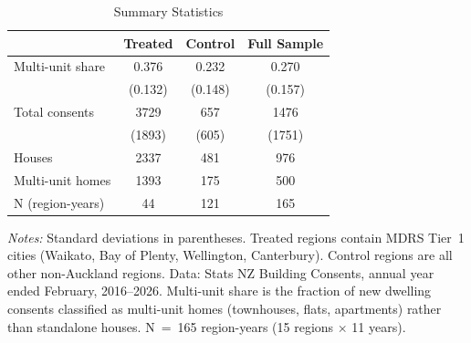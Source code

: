 \begin{table}[H]
\centering
\caption{Summary Statistics}
\label{tab:summary}
\begin{threeparttable}
\begin{tabular}{lccc}
\toprule
 & Treated & Control & Full Sample \\
\midrule
Multi-unit share & 0.376 & 0.232 & 0.270 \\
 & (0.132) & (0.148) & (0.157) \\
Total consents & 3729 & 657 & 1476 \\
 & (1893) & (605) & (1751) \\
Houses & 2337 & 481 & 976 \\
Multi-unit homes & 1393 & 175 & 500 \\
N (region-years) & 44 & 121 & 165 \\
\bottomrule
\end{tabular}
\begin{tablenotes}[flushleft]
\small
\item \textit{Notes:} Standard deviations in parentheses. Treated regions contain MDRS Tier~1 cities (Waikato, Bay of Plenty, Wellington, Canterbury). Control regions are all other non-Auckland regions. Data: Stats NZ Building Consents, annual year ended February, 2016--2026. Multi-unit share is the fraction of new dwelling consents classified as multi-unit homes (townhouses, flats, apartments) rather than standalone houses. N~=~165 region-years (15 regions $\times$ 11 years).
\end{tablenotes}
\end{threeparttable}
\end{table}
